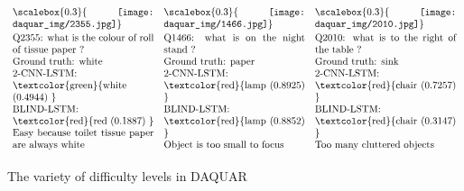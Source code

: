 \begin{figure*}[ht!]
\small
$\begin{array}{p{5cm} p{5cm} p{5cm}}
    \scalebox{0.3}{
        \texttt{[image: daquar\_img/2355.jpg]}}
    \parbox{5cm}{
        \vskip 0.05in
        Q2355: what is the colour of roll of tissue paper ?\\
        Ground truth: white\\
2-CNN-LSTM: \textcolor{green}{white (0.4944) }\\
BLIND-LSTM: \textcolor{red}{red (0.1887) }
\\
Easy because toilet tissue paper are always white}
&
    \scalebox{0.3}{
        \texttt{[image: daquar\_img/1466.jpg]}}
    \parbox{5cm}{
        \vskip 0.05in
        Q1466: what is on the night stand ?\\
        Ground truth: paper\\
2-CNN-LSTM: \textcolor{red}{lamp (0.8925) }\\
BLIND-LSTM: \textcolor{red}{lamp (0.8852) }
\\
Object is too small to focus}
&
    \scalebox{0.3}{
        \texttt{[image: daquar\_img/2010.jpg]}}
    \parbox{5cm}{
        \vskip 0.05in
        Q2010: what is to the right of the table ?\\
        Ground truth: sink\\
2-CNN-LSTM: \textcolor{red}{chair (0.7257) }\\
BLIND-LSTM: \textcolor{red}{chair (0.3147) }
\\
Too many cluttered objects}
\\
\end{array}$
\caption{The variety of difficulty levels in DAQUAR}
\end{figure*}
